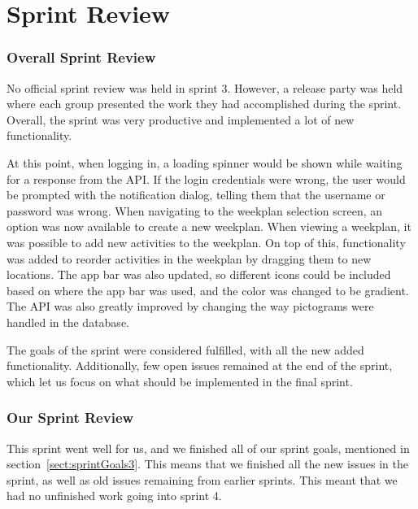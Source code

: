 \section{Sprint Review}
\subsubsection{Overall Sprint Review}
No official sprint review was held in sprint 3. However, a release party was held where each group presented the work they had accomplished during the sprint.
Overall, the sprint was very productive and implemented a lot of new functionality. 

At this point, when logging in, a loading spinner would be shown while waiting for a response from the API. If the login credentials were wrong, the user would be prompted with the notification dialog, telling them that the username or password was wrong. 
When navigating to the weekplan selection screen, an option was now available to create a new weekplan. When viewing a weekplan, it was possible to add new activities to the weekplan. On top of this, functionality was added to reorder activities in the weekplan by dragging them to new locations.
The app bar was also updated, so different icons could be included based on where the app bar was used, and the color was changed to be gradient. 
The API was also greatly improved by changing the way pictograms were handled in the database. 

The goals of the sprint were considered fulfilled, with all the new added functionality. Additionally, few open issues remained at the end of the sprint, which let us focus on what should be implemented in the final sprint.



\subsubsection{Our Sprint Review}
This sprint went well for us, and we finished all of our sprint goals, mentioned in section~\ref{sect:sprintGoals3}. This means that we finished all the new issues in the sprint, as well as old issues remaining from earlier sprints. This meant that we had no unfinished work going into sprint 4. 

